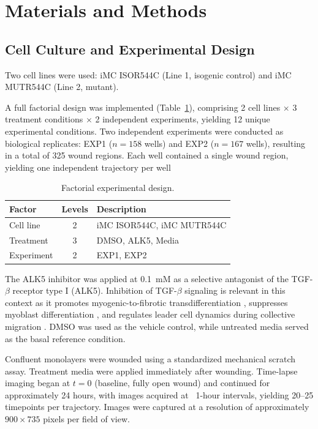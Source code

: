 \section{Materials and Methods}

\subsection{Cell Culture and Experimental Design}

Two cell lines were used: iMC ISOR544C (Line 1, isogenic control) and iMC MUTR544C (Line 2, mutant).

A full factorial design was implemented (Table~\ref{tab:experimental-design}), comprising 2 cell lines $\times$ 3 treatment conditions $\times$ 2 independent experiments, yielding 12 unique experimental conditions. Two independent experiments were conducted as biological replicates: EXP1 ($n = 158$ wells) and EXP2 ($n = 167$ wells), resulting in a total of 325 wound regions. Each well contained a single wound region, yielding one independent trajectory per well


\begin{table}[htbp]
	\centering
	\caption{Factorial experimental design.}
	\label{tab:experimental-design}
	\begin{tabular}{lcl}
		\toprule
		Factor & Levels & Description \\
		\midrule
		Cell line  & 2 & iMC ISOR544C, iMC MUTR544C \\
		Treatment  & 3 & DMSO, ALK5, Media \\
		Experiment & 2 & EXP1, EXP2 \\
		\bottomrule
	\end{tabular}
\end{table}

The ALK5 inhibitor was applied at 0.1~mM as a selective antagonist of the TGF-$\beta$ receptor type I (ALK5). Inhibition of TGF-$\beta$ signaling is relevant in this context as it promotes myogenic-to-fibrotic transdifferentiation \citep{Li2004}, suppresses myoblast differentiation \citep{McFarland2001}, and regulates leader cell dynamics during collective migration \citep{Vishwakarma2014}. DMSO was used as the vehicle control, while untreated media served as the basal reference condition.

Confluent monolayers were wounded using a standardized mechanical scratch assay. Treatment media were applied immediately after wounding. Time-lapse imaging began at $t = 0$ (baseline, fully open wound) and continued for approximately 24 hours, with images acquired at ~1-hour intervals, yielding 20–25 timepoints per trajectory. Images were captured at a resolution of approximately $900 \times 735$ pixels per field of view.

